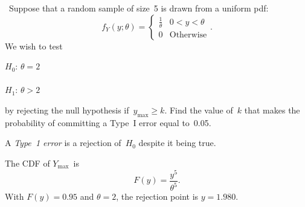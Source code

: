 \begin{problem}
  ~Suppose that a random sample of size~5 is drawn from a uniform pdf:
  \begin{equation}
    f_{Y}(y;\theta) = \begin{cases}
                        \frac{1}{\theta} & 0 < y < \theta \\
                        0 & \text{Otherwise}
                      \end{cases}\text{.}
  \end{equation}
  \noindent
  We wish to test
  \begin{center}
    $H_0$: $\theta = 2$ \\
     \\
    $H_1$: $\theta > 2$ \\
  \end{center}
  \noindent
  by rejecting the null hypothesis if~${y_{\max} \geq k}$. Find the value of~$k$ that makes the probability of committing a Type~I error equal to~0.05.
\end{problem}

A \textit{Type~1 error} is a rejection of~$H_0$ despite it being true.

\noindent
The CDF of $Y_{\max}$~is
\begin{equation*}
  F(y) = \frac{y^5}{\theta ^5}\text{.}
\end{equation*}
With ${F(y) = 0.95}$ and ${\theta = 2}$, the rejection point is ${\boxed{y = 1.980}}$.

